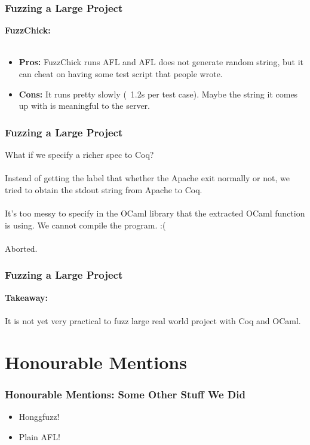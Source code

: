 \documentclass{beamer}
\begin{document}
\begin{frame}
\frametitle{Fuzzing a Large Project}
\textbf{FuzzChick:} \\~\\

\begin{itemize}
    \item \textbf{Pros:} FuzzChick runs AFL and AFL does not generate random string, but it can cheat on having some test script that people wrote.
    
    \item \textbf{Cons:} It runs pretty slowly (~1.2s per test case). Maybe the string it comes up with is meaningful to the server.
\end{itemize}

\end{frame}

\begin{frame}
\frametitle{Fuzzing a Large Project}
    What if we specify a richer spec to Coq? \\~\\
    \pause{}
    Instead of getting the label that whether the Apache exit normally or not, we tried to obtain the stdout string from Apache to Coq. \\~\\
    \pause{}
    It's too messy to specify in the OCaml library that the extracted OCaml function is using. We cannot compile the program. :(  \\~\\
    \pause{}
    Aborted.
\end{frame}

\begin{frame}
\frametitle{Fuzzing a Large Project}

\textbf{Takeaway:} \\~\\
It is not yet very practical to fuzz large real world project with Coq and OCaml.
    
\end{frame}
\section{Honourable Mentions}

\begin{frame}
  \frametitle{Honourable Mentions: Some Other Stuff We Did}

  \begin{itemize}
  \item Honggfuzz!
  \item Plain AFL!
  \end{itemize}
\end{frame}
\end{document}
